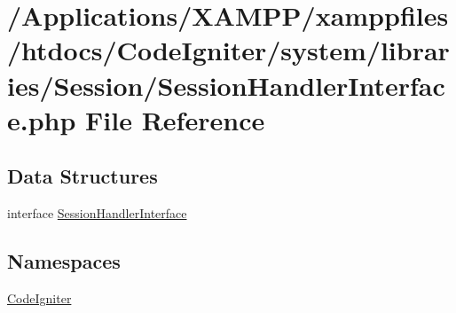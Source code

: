 \hypertarget{_session_handler_interface_8php}{}\section{/\+Applications/\+X\+A\+M\+P\+P/xamppfiles/htdocs/\+Code\+Igniter/system/libraries/\+Session/\+Session\+Handler\+Interface.php File Reference}
\label{_session_handler_interface_8php}
\subsection*{Data Structures}
\begin{DoxyCompactItemize}
\item 
interface \mbox{\hyperlink{interface_session_handler_interface}{Session\+Handler\+Interface}}
\end{DoxyCompactItemize}
\subsection*{Namespaces}
\begin{DoxyCompactItemize}
\item 
 \mbox{\hyperlink{namespace_code_igniter}{Code\+Igniter}}
\end{DoxyCompactItemize}
